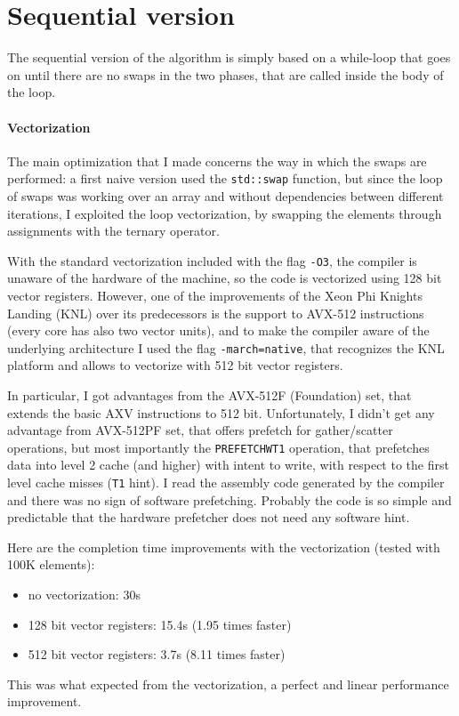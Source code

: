 \section{Sequential version}
The sequential version of the algorithm is simply based on a while-loop that goes on until there are no swaps in the two phases, that are called inside the body of the loop.

\paragraph{Vectorization}
The main optimization that I made concerns the way in which the swaps are performed: a first naive version used the \texttt{std::swap} function, but since the loop of swaps was working over an array and without dependencies between different iterations, I exploited the loop vectorization, by swapping the elements through assignments with the ternary operator.

With the standard vectorization included with the flag \texttt{-O3}, the compiler is unaware of the hardware of the machine, so the code is vectorized using 128 bit vector registers. However, one of the improvements of the Xeon Phi Knights Landing (KNL) over its predecessors is the support to AVX-512 instructions (every core has also two vector units), and to make the compiler aware of the underlying architecture I used the flag \texttt{-march=native}, that recognizes the KNL platform and allows to vectorize with 512 bit vector registers.

In particular, I got advantages from the AVX-512F (Foundation) set, that extends the basic AXV instructions to 512 bit. Unfortunately, I didn't get any advantage from AVX-512PF set, that offers prefetch for gather/scatter operations, but most importantly the \texttt{PREFETCHWT1} operation, that prefetches data into level 2 cache (and higher) with intent to write, with respect to the first level cache misses (\texttt{T1} hint). I read the assembly code generated by the compiler and there was no sign of software prefetching. Probably the code is so simple and predictable that the hardware prefetcher does not need any software hint.
\bigbreak

Here are the completion time improvements with the vectorization (tested with 100K elements):
\begin{itemize}
    \item no vectorization: 30s
    \item 128 bit vector registers: 15.4s (1.95 times faster)
    \item 512 bit vector registers: 3.7s (8.11 times faster)
\end{itemize}
This was what expected from the vectorization, a perfect and linear performance improvement.

